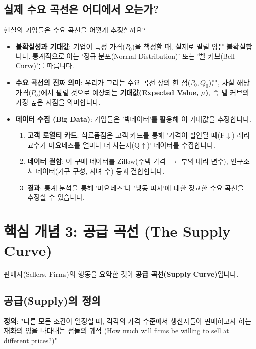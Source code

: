 \documentclass[11pt,a4paper]{article}
\theoremstyle{definition}
\begin{document}
\subsection{실제 수요 곡선은 어디에서 오는가?}

현실의 기업들은 수요 곡선을 어떻게 추정할까요?

\begin{itemize}
    \item \textbf{불확실성과 기대값}: 기업이 특정 가격($P_0$)을 책정할 때, 실제로 팔릴 양은 불확실합니다. 통계적으로 이는 '정규 분포(Normal Distribution)' 또는 '벨 커브(Bell Curve)'를 따릅니다.
    \item \textbf{수요 곡선의 진짜 의미}: 우리가 그리는 수요 곡선 상의 한 점($P_0, Q_0$)은, 사실 해당 가격($P_0$)에서 팔릴 것으로 예상되는 \textbf{기대값(Expected Value, $\mu$)}, 즉 벨 커브의 가장 높은 지점을 의미합니다.
    \item \textbf{데이터 수집 (Big Data)}: 기업들은 '빅데이터'를 활용해 이 기대값을 추정합니다.
        \begin{enumerate}
            \item \textbf{고객 로열티 카드}: 식료품점은 고객 카드를 통해 '가격이 할인될 때(P$\downarrow$) 래리 교수가 마요네즈를 얼마나 더 사는지(Q$\uparrow$)' 데이터를 수집합니다.
            \item \textbf{데이터 결합}: 이 구매 데이터를 Zillow(주택 가격 $\to$ 부의 대리 변수), 인구조사 데이터(가구 구성, 자녀 수) 등과 결합합니다.
            \item \textbf{결과}: 통계 분석을 통해 '마요네즈'나 '냉동 피자'에 대한 정교한 수요 곡선을 추정할 수 있습니다.
        \end{enumerate}
\end{itemize}

\newpage

\section{핵심 개념 3: 공급 곡선 (The Supply Curve)}

판매자(Sellers, Firms)의 행동을 요약한 것이 \textbf{공급 곡선(Supply Curve)}입니다.

\subsection{공급(Supply)의 정의}

\textbf{정의}: "다른 모든 조건이 일정할 때, 각각의 가격 수준에서 생산자들이 판매하고자 하는 재화의 양을 나타내는 점들의 궤적 (How much will firms be willing to sell at different prices?)"
\end{document}
